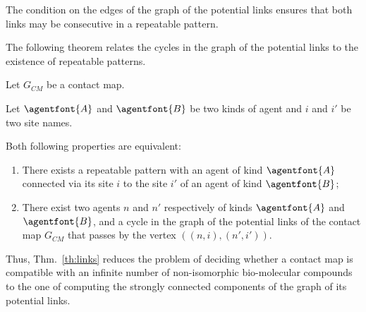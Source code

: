 \documentclass{entcs}
\newcommand{\graphsymb}{G}
\begin{document}
The condition on the edges of the graph of the potential links ensures that
both links may be consecutive in a repeatable pattern.

The following theorem relates the cycles in the graph of the potential links to the existence of repeatable patterns.

\begin{theorem}
  \label{th:links}
  Let $\graphsymb_{\textit{CM}}$ be a contact map.

Let $\agentfont{A}$ and $\agentfont{B}$ be two kinds of agent and
$i$ and $i'$ be two site names.

  Both following properties are equivalent:
  \begin{enumerate}
    \item There exists a repeatable pattern
    with an agent of kind $\agentfont{A}$ connected via its site $i$
    to the site $i'$ of an agent of kind $\agentfont{B}$;
\item There exist two agents $n$ and $n'$ respectively of kinds $\agentfont{A}$
and  $\agentfont{B}$, and a  cycle in the graph of the potential links of the contact map    $\graphsymb_{\textit{CM}}$  that passes by the vertex $((n,i),(n',i'))$.
  \end{enumerate}
\end{theorem}

Thus, Thm.~\ref{th:links} reduces the problem of deciding whether
a contact map is compatible with an infinite number of non-isomorphic bio-molecular compounds to the one of computing the strongly connected components of the graph of its potential links.
\end{document}

